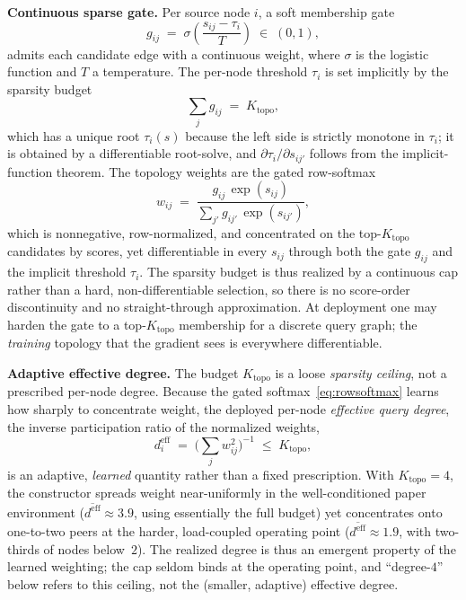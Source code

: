 \documentclass[journal]{IEEEtran}
\newcommand{\Ktopo}{\ensuremath{K_{\mathrm{topo}}}}      %
\begin{document}
\textbf{Continuous sparse gate.} Per source node $i$, a soft membership gate
\begin{equation}
  g_{ij} \;=\; \sigma\!\left(\frac{s_{ij}-\tau_i}{T}\right) \;\in\; (0,1),
  \label{eq:gate}
\end{equation}
admits each candidate edge with a continuous weight, where $\sigma$ is the
logistic function and $T$ a temperature. The per-node threshold $\tau_i$ is set
implicitly by the sparsity budget
\begin{equation}
  \textstyle\sum_{j} g_{ij} \;=\; \Ktopo,
  \label{eq:budget}
\end{equation}
which has a unique root $\tau_i(s)$ because the left side is strictly monotone in
$\tau_i$; it is obtained by a differentiable root-solve, and $\partial\tau_i/\partial s_{ij'}$
follows from the implicit-function theorem. The topology weights are the gated
row-softmax
\begin{equation}
  w_{ij} \;=\; \frac{g_{ij}\,\exp(s_{ij})}{\sum_{j'} g_{ij'}\,\exp(s_{ij'})},
  \label{eq:rowsoftmax}
\end{equation}
which is nonnegative, row-normalized, and concentrated on the top-$\Ktopo$
candidates by scores, yet differentiable in every $s_{ij}$ through both the gate
$g_{ij}$ and the implicit threshold $\tau_i$. The sparsity budget is thus realized
by a continuous cap rather than a hard, non-differentiable selection, so there is
no score-order discontinuity and no straight-through approximation. At deployment
one may harden the gate to a top-$\Ktopo$ membership for a discrete query graph;
the \emph{training} topology that the gradient sees is everywhere differentiable.

\textbf{Adaptive effective degree.} The budget $\Ktopo$ is a loose \emph{sparsity
ceiling}, not a prescribed per-node degree. Because the gated
softmax~\eqref{eq:rowsoftmax} learns how sharply to concentrate weight, the
deployed per-node \emph{effective query degree}, the inverse participation ratio
of the normalized weights,
\begin{equation}
  d^{\mathrm{eff}}_i \;=\; \Big(\textstyle\sum_{j} w_{ij}^2\Big)^{-1}\;\le\;\Ktopo,
  \label{eq:effdeg}
\end{equation}
is an adaptive, \emph{learned} quantity rather than a fixed prescription. With
$\Ktopo{=}4$, the constructor spreads weight near-uniformly in the
well-conditioned paper environment ($\overline{d^{\mathrm{eff}}}\!\approx\!3.9$,
using essentially the full budget) yet concentrates onto one-to-two peers at the
harder, load-coupled operating point ($\overline{d^{\mathrm{eff}}}\!\approx\!1.9$,
with two-thirds of nodes below~$2$). The realized degree is thus an emergent
property of the learned weighting; the cap seldom binds at the operating point,
and ``degree-$4$'' below refers to this ceiling, not the (smaller, adaptive)
effective degree.
\end{document}
